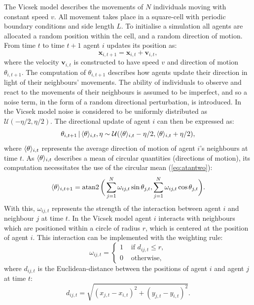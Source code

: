 The Vicsek model describes the movements of $N$ individuals moving with constant speed
$v$. All movement takes place in a square-cell with periodic boundary conditions and side
length $L$. To initialise a simulation all agents are allocated a random position within
the cell, and a random direction of motion. From time $t$ to time $t+1$ agent $i$ updates
its position as:
\begin{equation*}
    \bm{x}_{i, t+1} = \bm{x}_{i, t} + \bm{v}_{i, t},
\end{equation*}
where the velocity $\bm{v}_{i,t}$ is constructed to have speed $v$ and direction of motion
$\theta_{i, t+1}$. The computation of $\theta_{i, t+1}$ describes how agents update their
direction in light of their neighbours' movements. The ability of individuals to observe
and react to the movements of their neighbours is assumed to be imperfect, and so a noise
term, in the form of a random directional perturbation, is introduced. In the Vicsek model
noise is considered to be uniformly distributed as $\mathcal{U}(-\eta/2, \eta/2)$. The
directional update of agent $i$ can then be expressed as:
\begin{equation}
    \label{eq:vicsek_update}
    \theta_{i, t+1} \,|\, \langle\theta\rangle_{i, t}, \eta \sim
                     \mathcal{U}(\langle\theta\rangle_{i, t} - \eta/2,
                                 \langle\theta\rangle_{i, t} + \eta/2),
\end{equation}
where $\langle\theta\rangle_{i, t}$ represents the average direction of motion of agent $i$'s
neighbours at time $t$. As $\langle\theta\rangle_{i, t}$ describes a mean of circular
quantities (directions of motion), its computation necessitates the use of the
circular mean (\cref{eq:atantwo}):
\begin{equation}
    \langle\theta\rangle_{i, t+1} = \operatorname{atan2}\bigg(
        \sum_{j=1}^N \omega_{ij, t} \sin\theta_{j,t},
        \sum_{j=1}^N \omega_{ij, t} \cos\theta_{j,t}
    \bigg).
\end{equation}
With this, $\omega_{ij, t}$ represents the strength of the interaction between agent $i$
and neighbour $j$ at time $t$. In the Vicsek model agent $i$ interacts with neighbours
which are positioned within a circle of radius $r$, which is centered at the position of
agent $i$. This interaction can be implemented with the weighting rule:
\begin{equation}
    \label{eq:vicsek_interaction}
    \omega_{ij,t} =
    \begin{cases}
        1 & \text{ if } d_{ij, t} \leq r,\\
        0 & \text{ otherwise,}
    \end{cases}
\end{equation}
where $d_{ij,t}$ is the Euclidean-distance between the positions of agent $i$ and agent
$j$ at time $t$:
\begin{equation*}
    d_{ij,t} = \sqrt{(x_{j,t} - x_{i,t})^2 + (y_{j,t} - y_{i,t})^2}.
\end{equation*}

